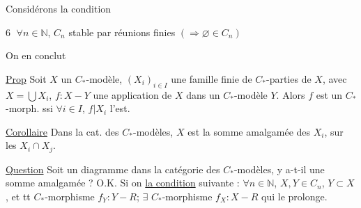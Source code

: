Considérons la condition

\textcircled{6} $\forall n\in\mathbb N$, $C_n$ stable par réunions finies $(\Rightarrow\varnothing\in C_n)$

On en conclut

\uline{Prop} Soit $X$ un $C_*$-modèle, $(X_i)_{i\in I}$ une  famille finie de $C_*$-parties de $X$, avec $X=\bigcup X_i$, $f:X-Y$ une application de $X$ dans un $C_*$-modèle $Y$.
Alors $f$ est un $C_*$-morph. ssi $\forall i\in I$, $f|X_i$ l'est.

\uline{Corollaire} Dans la cat. des $C_*$-modèles, $X$ est la somme amalgamée des $X_i$, sur les $X_i\cap X_j$.

\uline{Question} Soit un diagramme
dans la catégorie des $C_*$-modèles, y a-t-il une somme amalgamée ? O.K. Si on  \uline{la condition} suivante :
$\forall n\in\mathbb N$, $X,Y\in C_n$, $Y\subset X$, et tt $C_*$-morphisme $f_Y:Y-R$; $\exists$ $C_*$-morphisme $f_X:X-R$ qui le prolonge.

